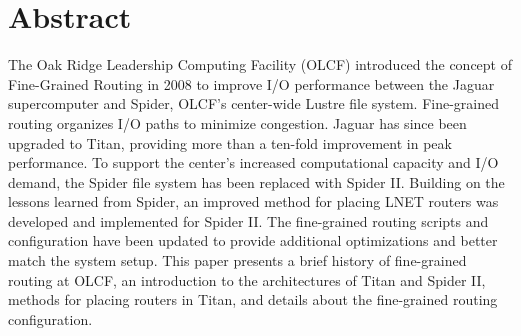 \section{Abstract}

The Oak Ridge Leadership Computing Facility (OLCF) introduced the concept of
Fine-Grained Routing in 2008 to improve I/O performance between the Jaguar
supercomputer and Spider, OLCF's center-wide Lustre file system. Fine-grained
routing organizes I/O paths to minimize congestion. Jaguar has since been
upgraded to Titan, providing more than a ten-fold improvement in peak
performance. To support the center's increased computational capacity and I/O
demand, the Spider file system has been replaced with Spider II. Building on
the lessons learned from Spider, an improved method for placing LNET routers
was developed and implemented for Spider II. The fine-grained routing scripts
and configuration have been updated to provide additional optimizations and
better match the system setup. This paper presents a brief history of
fine-grained routing at OLCF, an introduction to the architectures of Titan and
Spider II, methods for placing routers in Titan, and details about the
fine-grained routing configuration.


